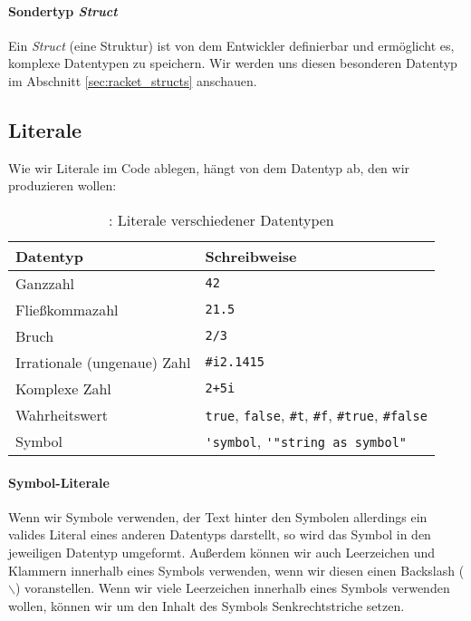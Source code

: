 	\paragraph{Sondertyp \textit{Struct}}
		Ein \textit{Struct} (eine Struktur) ist von dem Entwickler definierbar und ermöglicht es, komplexe Datentypen zu speichern. Wir werden uns diesen besonderen Datentyp im Abschnitt \ref{sec:racket_structs} anschauen.

\subsection{Literale}
	
	Wie wir Literale im Code ablegen, hängt von dem Datentyp ab, den wir produzieren wollen:
	
	\begin{table}[H]
		\centering
		\begin{tabular}{l | l}
			\textbf{Datentyp} & \textbf{Schreibweise} \\ \hline
			Ganzzahl & \lstinline[language = Racket]|42| \\
			Fließkommazahl & \lstinline[language = Racket]|21.5| \\
			Bruch & \lstinline[language = Racket]|2/3| \\
			Irrationale (ungenaue) Zahl & \lstinline[language = Racket]|#i2.1415| \\
			Komplexe Zahl & \lstinline[language = Racket]|2+5i| \\
			Wahrheitswert & \lstinline[language = Racket]|true|, \lstinline[language = Racket]|false|, \lstinline[language = Racket]|#t|, \lstinline[language = Racket]|#f|, \lstinline[language = Racket]|#true|, \lstinline[language = Racket]|#false| \\
			Symbol & \lstinline[language = Racket]|'symbol|, \lstinline[language = Racket]|'"string as symbol"| \\
		\end{tabular}
		\caption{\racket: Literale verschiedener Datentypen}
	\end{table}

	\paragraph{Symbol-Literale}
		Wenn wir Symbole verwenden, der Text hinter den Symbolen allerdings ein valides Literal eines anderen Datentyps darstellt, so wird das Symbol in den jeweiligen Datentyp umgeformt. Außerdem können wir auch Leerzeichen und Klammern innerhalb eines Symbols verwenden, wenn wir diesen einen Backslash (\(\backslash\)) voranstellen. Wenn wir viele Leerzeichen innerhalb eines Symbols verwenden wollen, können wir um den Inhalt des Symbols Senkrechtstriche setzen.
		
